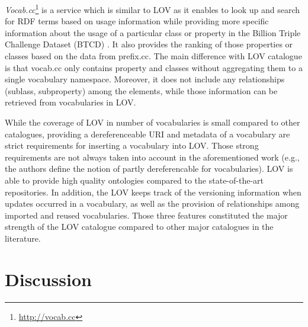 \documentclass{iosart2c}
\begin{document}
\textit{Vocab.cc}\footnote{\url{http://vocab.cc}} is a service which is similar to LOV as it enables to look up and search for RDF terms based on usage information while providing more specific information about the usage of a particular class or property in the Billion Triple Challenge Dataset (BTCD) \cite{vocabcc2013}. It also provides the ranking of those properties or classes based on the data from prefix.cc. The main difference with LOV catalogue is that vocab.cc only contains property and classes without aggregating them to a single vocabulary namespace. Moreover, it does not include any relationships (sublass, subproperty) among the elements, while those information can be retrieved from vocabularies in LOV. 

 While the coverage of LOV in number of vocabularies is small compared to other catalogues, providing a dereferenceable URI and metadata of a vocabulary are strict requirements for inserting a vocabulary into LOV. Those strong requirements are not always taken into account in the aforementioned work (e.g., the authors define the notion of partly dereferencable for vocabularies). LOV is able to provide high quality ontologies compared to the state-of-the-art repositories. In addition, the LOV keeps track of the versioning information when updates occurred in a vocabulary, as well as the provision of relationships among imported and reused vocabularies.  Those three features constituted the major strength of the LOV catalogue compared to other major catalogues in the literature. 


\section{Discussion}\label{sec:discussion}


\end{document}
